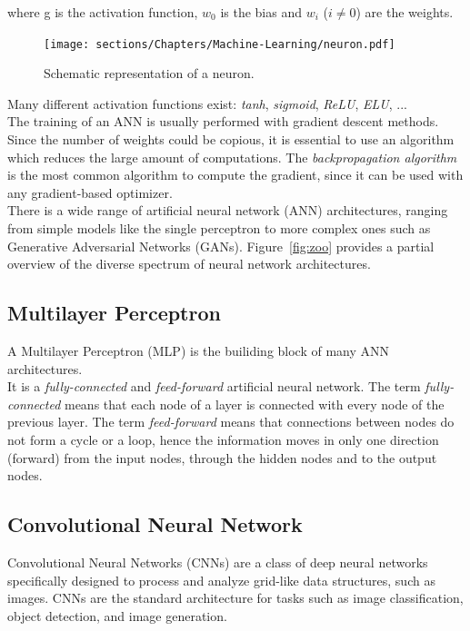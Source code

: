 where g is the activation function, $w_{0}$ is the bias and $w_{i}$ ($i \ne 0$) are the weights.

\begin{figure}[h]
\centering
    \texttt{[image: sections/Chapters/Machine-Learning/neuron.pdf]}
\caption{Schematic representation of a neuron.}
\end{figure}


Many different activation functions exist: \textit{tanh}, \textit{sigmoid}, \textit{ReLU}, \textit{ELU}, ...\\
The training of an ANN is usually performed with gradient descent methods.
Since the number of weights could be copious, it is essential to use an algorithm which reduces the large amount of computations.
The \textit{backpropagation algorithm} is the most common algorithm to compute the gradient, since it can be used with any gradient-based optimizer.\\

There is a wide range of artificial neural network (ANN) architectures, ranging from simple models like the single perceptron to more complex ones 
such as Generative Adversarial Networks (GANs). Figure~\ref{fig:zoo} provides a partial overview of the diverse spectrum of neural network architectures.

\subsection{Multilayer Perceptron}

A Multilayer Perceptron (MLP) is the builiding block of many ANN architectures.\\
It is a \textit{fully-connected} and \textit{feed-forward} artificial neural network.
The term \textit{fully-connected} means that each node of a layer is connected with every node of the previous layer.
The term \textit{feed-forward} means that connections between nodes do not form a cycle or a loop, hence the information moves in only 
one direction (forward) from the input nodes, through the hidden nodes and to the output nodes.


\subsection{Convolutional Neural Network}

Convolutional Neural Networks (CNNs) are a class of deep neural networks specifically designed to process and analyze grid-like data structures, 
such as images. CNNs are the standard architecture for tasks such as image 
classification, object detection, and image generation.\\

